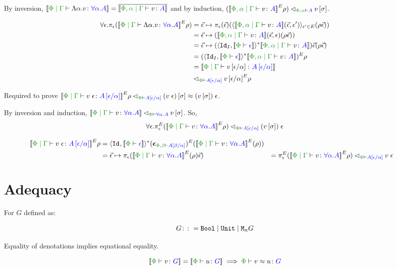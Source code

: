 \documentclass{Report}
\newcommand\eLogRel[4]{\logRel{#2}{\wellformed{#1}{#3}}{#4}}
\newcommand\peLogRel[3]{\eLogRel{\P}{#1}{#2}{#3}}
\newcommand{\zptyperelation}[2]{\typerelation{\P}{#1}{#2}}
\newcommand{\zpberelation}[2]{\berelation{\P}{#1}{#2}}
\newcommand{\fapply}[0]{^E}
\newcommand{\pe}[0]{\pi_\e}
\begin{document}

By inversion, $\deno{\gpetyperelation{\elam{\a}{v}}{\all{\a}{A}}} = \bar{\deno{\etyperelation{\P,\a}{\G}{v}{A}}}$ and by induction, $\eLogRel{\P,\a}{(\deno{\etyperelation{\P,\a}{\G}{v}{A}}\fapply\rho)}{A}{v\ssi}$.

\begin{align*}
    \forall{\e}. \pe(\deno{\gpetyperelation{\elam{\a}{v}}{\all{\a}{A}}}\fapply\rho)&= \ev \mapsto \pe(\ev)(\finpr{\deno{\etyperelation{\P, \a}{\G}{v}{A}}(\ev, \e')}{\e'\in E}(\rho \ev))\\
    & = \ev \mapsto (\deno{\etyperelation{\P, \a}{\G}{v}{A}}(\ev, \e)(\rho \ev))\\
    & = \ev \mapsto (\pr{\Id{I}}{\deno{\wellformed{\P}{\e}}}\star\deno{\etyperelation{\P,\a}{\G}{v}{A}})\ev (\rho\ev)\\
    & = (\pr{\Id{I}}{\deno{\wellformed{\P}{\e}}}\star\deno{\etyperelation{\P,\a}{\G}{v}{A}})\fapply \rho\\
    & = \deno{\gpetyperelation{v\ssub{\a}{\e}}{A\ssub{\a}{\e}}}\\
    & \relates_{\wellformed{\P}{A\ssub{\a}{\e}}}{v\ssub{\a}{\e}}\fapply\rho
\end{align*}

Required to prove $\peLogRel{\deno{\gpetyperelation{\eapp{v}{\e}}{A\ssub{\a}{\e}}}\fapply\rho}{A\ssub{\a}{\e}}{(\eapp{v}{\e})\ssi\beequiv\eapp{(v\ssi)}{\e}}$.

By inversion and induction, $\peLogRel{\deno{\gpetyperelation{v}{\all{\a}{A}}}}{\all{\a}{A}}{v\ssi}$. So, $$\forall\e. \peLogRel{\pe\fapply(\deno{\gpetyperelation{v}{\all{\a}{A}}}\fapply\rho)}{A\ssub{\a}{\e}}{\eapp{(v\ssi)}{\e}}$$

\begin{align*}
    \deno{\gpetyperelation{\eapp{v}{\e}}{A\ssub{\a}{\e}}}\fapply\rho & = \pr{\Id{}}{\deno{\wellformed{\P}{\e}}}\star(\counit{\wellformed{\P,\b}{A\ssub{\a}{\b}}})\fapply(\deno{\gpetyperelation{v}{\all{\a}{A}}}\fapply(\rho))\\
    & = \ev\mapsto\pe(\deno{\gpetyperelation{v}{\all{\a}{A}}}\fapply(\rho)\ev)
    & = \pe\fapply(\deno{\gpetyperelation{v}{\all{\a}{A}}}\fapply\rho)
    & \peLogRel{}{A\ssub{\a}{\e}}{\eapp{v}{\e}}
\end{align*}


\section{Adequacy}
\begin{theorem}[Adequacy]
For $G$ defined as:

\begin{align*}
    G\colon\colon= \texttt{Bool} \mid \texttt{Unit} \mid \texttt{M}_{n}{G}
\end{align*}

Equality of denotations implies equational equality.

\begin{equation}
    \deno{\zptyperelation{v}{G}} = \deno{\zptyperelation{u}{G}} \implies \zpberelation{v}{u}{G}
\end{equation}

\end{theorem}
\end{document}
